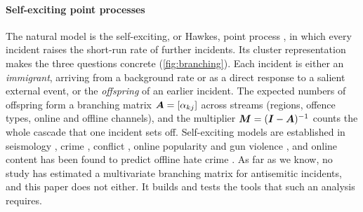 \paragraph{Self-exciting point processes}
The natural model is the self-exciting, or Hawkes, point process
\citep{hawkes1971}, in which every incident raises the short-run rate of
further incidents. Its cluster representation \citep{hawkes1974} makes the
three questions concrete (\cref{fig:branching}). Each incident is either an
\emph{immigrant}, arriving from a background rate or as a direct response to
a salient external event, or the \emph{offspring} of an earlier incident.
The expected numbers of offspring form a branching matrix
$\bm{A}=[\alpha_{kj}]$ across streams (regions, offence types, online and
offline channels), and the multiplier $\bm{M}=(\bm{I}-\bm{A})^{-1}$ counts the
whole cascade that one incident sets off. Self-exciting models are
established in seismology \citep{ogata1988}, crime
\citep{mohler2011,reinhart2018}, conflict \citep{lewis2012}, online popularity
\citep{zhao2015,rizoiu2017} and gun violence \citep{loeffler2018}, and online
content has been found to predict offline hate crime \citep{muller2021,williams2020}.
As far as we know, no study has estimated a multivariate branching matrix for
antisemitic incidents, and this paper does not either. It builds and tests the
tools that such an analysis requires.

